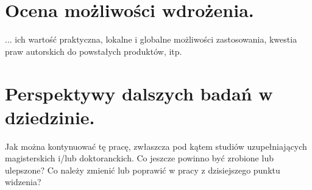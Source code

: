 \documentclass[twoside,12pt]{report}
\begin{document}
\section{Ocena możliwości wdrożenia.}
... ich wartość praktyczna, lokalne i globalne możliwości zastosowania, kwestia
praw autorskich do powstałych produktów, itp. 

\section{Perspektywy dalszych badań w dziedzinie.}
Jak można kontynuować tę pracę, zwłaszcza pod kątem studiów
uzupełniających magisterskich i/lub doktoranckich. Co jeszcze powinno być
zrobione lub ulepszone? Co należy zmienić lub poprawić w pracy z dzisiejszego punktu widzenia?



\listoffigures

\listoftables

\lstlistoflistings
\end{document}
